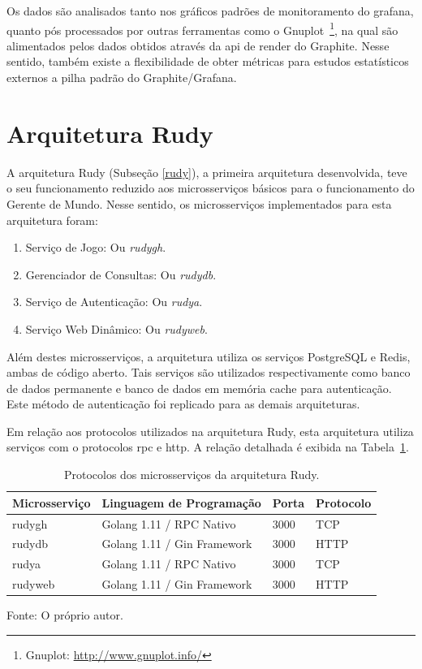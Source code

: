 Os dados são analisados tanto nos gráficos padrões de monitoramento do grafana, quanto pós processados por outras ferramentas como o Gnuplot~\footnote{Gnuplot: \url{http://www.gnuplot.info/}}, na qual são alimentados pelos dados obtidos através da \ac{api} de render do Graphite.
%
Nesse sentido, também existe a flexibilidade de obter métricas para estudos estatísticos externos a pilha padrão do Graphite/Grafana.



\section{Arquitetura Rudy}
\label{sec:arc_rudy}

A arquitetura Rudy (Subseção \ref{rudy}), a primeira arquitetura desenvolvida, teve o seu funcionamento reduzido aos microsserviços básicos para o funcionamento do Gerente de Mundo.
%
Nesse sentido, os microsserviços implementados para esta arquitetura foram:

\begin{enumerate}
    \item Serviço de Jogo: Ou \textit{rudygh}.
    \item Gerenciador de Consultas: Ou \textit{rudydb}.
    \item Serviço de Autenticação: Ou \textit{rudya}.
    \item Serviço Web Dinâmico: Ou \textit{rudyweb}.
\end{enumerate}



Além destes microsserviços, a arquitetura utiliza os serviços PostgreSQL e Redis, ambas de código aberto.
%
Tais serviços são utilizados respectivamente como banco de dados permanente e banco de dados em memória cache para autenticação.
%
Este método de autenticação foi replicado para as demais arquiteturas.

Em relação aos protocolos utilizados na arquitetura Rudy, esta arquitetura utiliza serviços com o protocolos \ac{rpc} e \ac{http}.
%
A relação detalhada é exibida na Tabela~\ref{tab:protocolos_rudy}.



\begin{table}[htb!]
    \centering
    \caption{Protocolos dos microsserviços da arquitetura Rudy.}
    \label{tab:protocolos_rudy}
    \begin{tabular}{|l|l|l|l|}
    \hline
    Microsserviço & Linguagem de Programação    & Porta & Protocolo \\ \hline
    rudygh        & Golang 1.11 / RPC Nativo    & 3000  & TCP       \\ \hline
    rudydb        & Golang 1.11 / Gin Framework & 3000  & HTTP      \\ \hline
    rudya         & Golang 1.11 / RPC Nativo    & 3000  & TCP       \\ \hline
    rudyweb       & Golang 1.11 / Gin Framework & 3000  & HTTP      \\ \hline
    \end{tabular}
    
    Fonte: O próprio autor.
\end{table}



